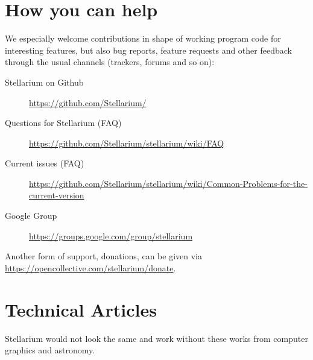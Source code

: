 \section{How you can help}
\label{sec:HowYouCanHelp}

We especially welcome contributions in shape of working program code
for interesting features, but also bug reports, feature requests and
other feedback through the usual channels (trackers, forums and so
on):
\begin{description}
\item[Stellarium on Github] \url{https://github.com/Stellarium/}
\item[Questions for Stellarium (FAQ)] \url{https://github.com/Stellarium/stellarium/wiki/FAQ}
\item[Current issues (FAQ)] \url{https://github.com/Stellarium/stellarium/wiki/Common-Problems-for-the-current-version}
\item[Google Group] \url{https://groups.google.com/group/stellarium}
\end{description}

Another form of support, donations, can be given via
\url{https://opencollective.com/stellarium/donate}. 

\section{Technical Articles}
\label{sec:ack:technical}

Stellarium would not look the same and work without these works from computer graphics and astronomy.

